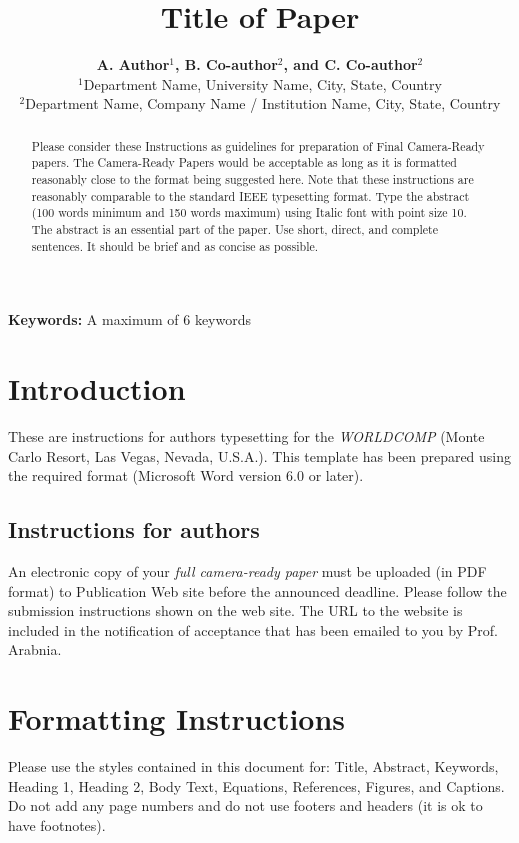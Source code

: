 \documentclass[conference]{worldcomp}
\title{\bf Title of Paper}           %
\author{
{\bfseries A. Author$^1$, B. Co-author$^2$, and C. Co-author$^2$}\\
$^1$Department Name, University Name, City, State, Country\\
$^2$Department Name, Company Name / Institution Name, City, State, Country\\
}
\begin{document}
\maketitle                        %


\begin{abstract}%
Please consider these Instructions as guidelines for preparation of 
Final Camera-Ready papers. The Camera-Ready Papers would be acceptable as 
long as it is formatted reasonably close to the format being suggested here. 
Note that these instructions are reasonably comparable to the standard IEEE 
typesetting format. Type the abstract (100 words minimum and 150 words maximum) 
using Italic font with point size 10. The abstract is an essential part of the 
paper. Use short, direct, and complete sentences. It should be brief and as concise as possible.
\end{abstract}


\vspace{1em}
\noindent\textbf{Keywords:}
 {\small  A maximum of 6 keywords} %



\section{Introduction}
These are instructions for authors typesetting for the {\em WORLDCOMP} 
(Monte Carlo Resort, Las Vegas, Nevada, U.S.A.). This 
template has been prepared using the required format (Microsoft Word version 6.0 or later). 

\subsection{Instructions for authors}
An electronic copy of your {\em full camera-ready paper} must be uploaded (in PDF format) 
to Publication Web site before the announced deadline. Please follow the submission 
instructions shown on the web site. The URL to the website is included in the 
notification of acceptance that has been emailed to you by Prof. Arabnia.

\section{Formatting Instructions}
Please use the styles contained in this document for: Title, Abstract, Keywords, 
Heading 1, Heading 2, Body Text, Equations, References, Figures, and Captions. 
Do not add any page numbers and do not use footers and headers (it is ok to have footnotes).
\end{document}
